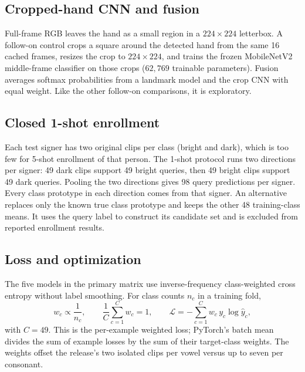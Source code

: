\documentclass[11pt,a4paper]{article}
\begin{document}
\subsection{Cropped-hand CNN and fusion}

Full-frame RGB leaves the hand as a small region in a $224\times 224$ letterbox. A follow-on control crops a square around the detected hand from the same 16 cached frames, resizes the crop to $224\times 224$, and trains the frozen MobileNetV2 middle-frame classifier on those crops ($62{,}769$ trainable parameters). Fusion averages softmax probabilities from a landmark model and the crop CNN with equal weight. Like the other follow-on comparisons, it is exploratory.

\subsection{Closed 1-shot enrollment}

Each test signer has two original clips per class (bright and dark), which is too few for 5-shot enrollment of that person. The 1-shot protocol runs two directions per signer: 49 dark clips support 49 bright queries, then 49 bright clips support 49 dark queries. Pooling the two directions gives 98 query predictions per signer. Every class prototype in each direction comes from that signer. An alternative replaces only the known true class prototype and keeps the other 48 training-class means. It uses the query label to construct its candidate set and is excluded from reported enrollment results.

\subsection{Loss and optimization}

The five models in the primary matrix use inverse-frequency class-weighted cross entropy without label smoothing. For class counts $n_c$ in a training fold,
\begin{equation}
w_c \propto \frac{1}{n_c}, \qquad
\frac{1}{C}\sum_{c=1}^{C} w_c = 1, \qquad
\mathcal{L} = -\sum_{c=1}^{C} w_c \, y_c \log \hat{y}_c,
\end{equation}
with $C=49$. This is the per-example weighted loss; PyTorch's batch mean divides the sum of example losses by the sum of their target-class weights. The weights offset the release's two isolated clips per vowel versus up to seven per consonant.
\end{document}
